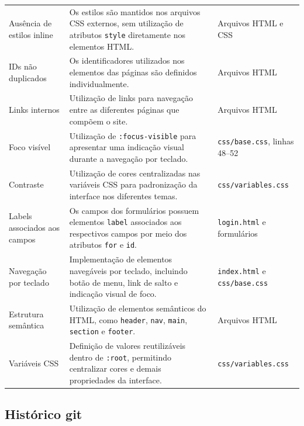 \begin{longtable}{p{3.2cm} p{7.2cm} p{3.0cm}}
	Ausência de estilos inline &
	Os estilos são mantidos nos arquivos CSS externos, sem utilização de atributos \texttt{style} diretamente nos elementos HTML. &
	Arquivos HTML e CSS \\
	
	IDs não duplicados &
	Os identificadores utilizados nos elementos das páginas são definidos individualmente. &
	Arquivos HTML \\
	
	Links internos &
	Utilização de links para navegação entre as diferentes páginas que compõem o site. &
	Arquivos HTML \\
	
	Foco visível &
	Utilização de \texttt{:focus-visible} para apresentar uma indicação visual durante a navegação por teclado. &
	\texttt{css/base.css}, linhas 48--52 \\
	
	Contraste &
	Utilização de cores centralizadas nas variáveis CSS para padronização da interface nos diferentes temas. &
	\texttt{css/variables.css} \\
	
	Labels associados aos campos &
	Os campos dos formulários possuem elementos \texttt{label} associados aos respectivos campos por meio dos atributos \texttt{for} e \texttt{id}. &
	\texttt{login.html} e formulários \\
	
	Navegação por teclado &
	Implementação de elementos navegáveis por teclado, incluindo botão de menu, link de salto e indicação visual de foco. &
	\texttt{index.html} e \texttt{css/base.css} \\
	
	Estrutura semântica &
	Utilização de elementos semânticos do HTML, como \texttt{header}, \texttt{nav}, \texttt{main}, \texttt{section} e \texttt{footer}. &
	Arquivos HTML \\
	
	Variáveis CSS &
	Definição de valores reutilizáveis dentro de \texttt{:root}, permitindo centralizar cores e demais propriedades da interface. &
	\texttt{css/variables.css} \\
	
\end{longtable}

\subsection{Histórico git}


